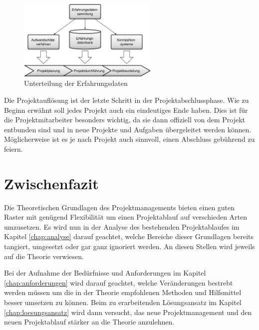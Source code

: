 \begin{figure}[htbp]
\begin{center}
\includegraphics[width=0.6\textwidth,angle=0]{./bilder/theorie/04_unterteilung_erfahrungsdaten.pdf}
\caption[Unterteilung der Erfahrungsdaten]{Unterteilung der Erfahrungsdaten\footnotemark}
\label{pic:04_unterteilung_erfahrungsdaten}
\end{center}
\end{figure}

Die Projektauflösung ist der letzte Schritt in der Projektabschlussphase. Wie 
zu Beginn erwähnt soll jedes Projekt auch ein eindeutiges Ende haben. Dies ist
für die Projektmitarbeiter besonders wichtig, da sie dann offiziell von dem
Projekt entbunden sind und in neue Projekte und Aufgaben übergeleitet werden
können. Möglicherweise ist es je nach Projekt auch sinnvoll, einen Abschluss
gebührend zu feiern.

\section{Zwischenfazit}
Die Theoretischen Grundlagen des Projektmanagements bieten einen guten Raster
mit genügend Flexibilität um einen Projektablauf auf verschieden Arten umzusetzen.
Es wird nun in der Analyse des bestehenden Projektablaufes im Kapitel \ref{chap:analyse}
darauf geachtet, welche Bereiche dieser Grundlagen bereits tangiert, umgesetzt
oder gar ganz ignoriert werden. An diesen Stellen wird jeweils auf die Theorie
verwiesen.

Bei der Aufnahme der Bedürfnisse und Anforderungen im Kapitel \ref{chap:anforderungen} 
wird darauf geachtet, welche Veränderungen bestrebt werden müssen um die in 
der Theorie empfohlenen Methoden und Hilfsmittel besser umsetzen zu können.
Beim zu erarbeitenden Lösungsansatz im Kapitel \ref{chap:loesungsansatz} wird dann versucht, 
das neue Projektmanagement und den neuen Projektablauf stärker an die Theorie 
anzulehnen.